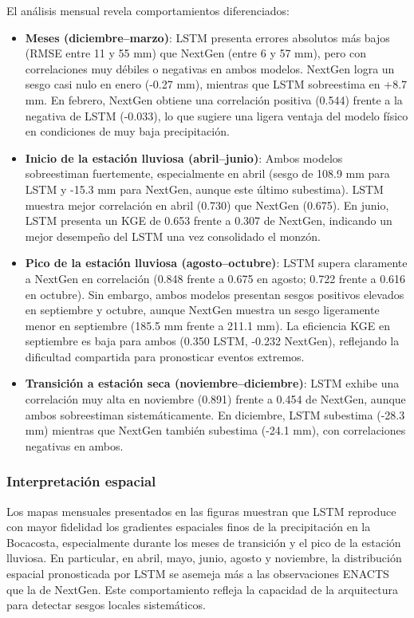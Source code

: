 El análisis mensual revela comportamientos diferenciados:

\begin{itemize}
	\item \textbf{Meses (diciembre–marzo)}: LSTM presenta errores absolutos más bajos (RMSE entre 11 y 55 mm) que NextGen (entre 6 y 57 mm), pero con correlaciones muy débiles o negativas en ambos modelos. NextGen logra un sesgo casi nulo en enero (-0.27 mm), mientras que LSTM sobreestima en +8.7 mm. En febrero, NextGen obtiene una correlación positiva (0.544) frente a la negativa de LSTM (-0.033), lo que sugiere una ligera ventaja del modelo físico en condiciones de muy baja precipitación.
	
	\item \textbf{Inicio de la estación lluviosa (abril–junio)}: Ambos modelos sobreestiman fuertemente, especialmente en abril (sesgo de 108.9 mm para LSTM y -15.3 mm para NextGen, aunque este último subestima). LSTM muestra mejor correlación en abril (0.730) que NextGen (0.675). En junio, LSTM presenta un KGE de 0.653 frente a 0.307 de NextGen, indicando un mejor desempeño del LSTM una vez consolidado el monzón.
	
	\item \textbf{Pico de la estación lluviosa (agosto–octubre)}: LSTM supera claramente a NextGen en correlación (0.848 frente a 0.675 en agosto; 0.722 frente a 0.616 en octubre). Sin embargo, ambos modelos presentan sesgos positivos elevados en septiembre y octubre, aunque NextGen muestra un sesgo ligeramente menor en septiembre (185.5 mm frente a 211.1 mm). La eficiencia KGE en septiembre es baja para ambos (0.350 LSTM, -0.232 NextGen), reflejando la dificultad compartida para pronosticar eventos extremos.
	
	\item \textbf{Transición a estación seca (noviembre–diciembre)}: LSTM exhibe una correlación muy alta en noviembre (0.891) frente a 0.454 de NextGen, aunque ambos sobreestiman sistemáticamente. En diciembre, LSTM subestima (-28.3 mm) mientras que NextGen también subestima (-24.1 mm), con correlaciones negativas en ambos.
\end{itemize}

\subsubsection*{Interpretación espacial}

Los mapas mensuales presentados en las figuras muestran que LSTM reproduce con mayor fidelidad los gradientes espaciales finos de la precipitación en la Bocacosta, especialmente durante los meses de transición y el pico de la estación lluviosa. En particular, en abril, mayo, junio, agosto y noviembre, la distribución espacial pronosticada por LSTM se asemeja más a las observaciones ENACTS que la de NextGen. Este comportamiento refleja la capacidad de la arquitectura para detectar sesgos locales sistemáticos.

